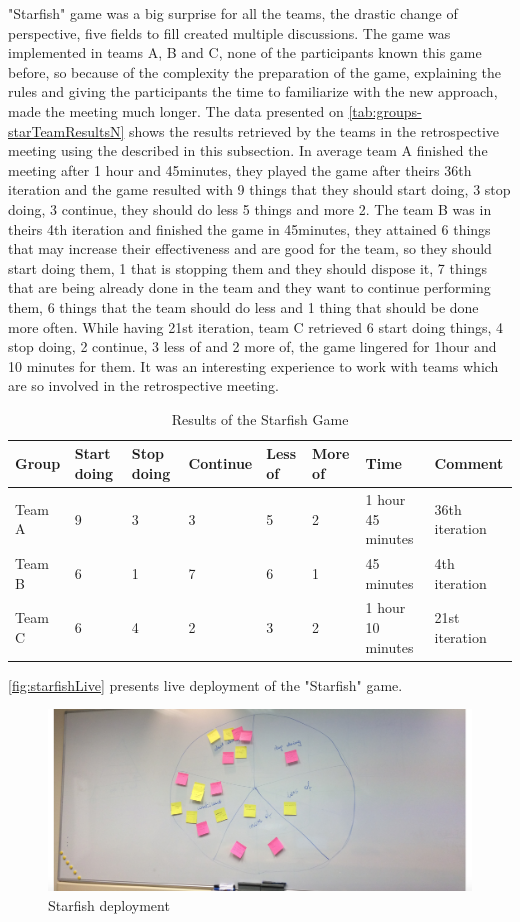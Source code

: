 "Starfish" game was a big surprise for all the teams, the drastic change of perspective, five fields to fill created multiple discussions. The game was implemented in teams A, B and C, none of the participants known this game before, so because of the complexity the preparation of the game, explaining the rules and giving the participants the time to familiarize with the new approach, made the meeting much longer. The data presented on \autoref{tab:groups-starTeamResultsN} shows the results retrieved by the teams in the retrospective meeting using the described in this subsection. In average team A finished the meeting after 1 hour and 45minutes, they played the game after theirs 36th iteration and the game resulted with 9 things that they should start doing, 3 stop doing, 3 continue, they should do less 5 things and more 2. The team B was in theirs 4th iteration and finished the game in 45minutes, they attained 6 things that may increase their effectiveness and are good for the team, so they should start doing them, 1 that is stopping them and they should dispose it, 7 things that are being already done in the team and they want to continue performing them, 6 things that the team should do less and 1 thing that should be done more often. While having 21st iteration, team C retrieved 6 start doing things, 4 stop doing, 2 continue, 3 less of and 2 more of, the game lingered for 1hour and 10 minutes for them. It was an interesting experience to work with teams which are so involved in the retrospective meeting.

\begin{table}[!htbp]
	\caption{Results of the Starfish Game}
	\label{tab:groups-starTeamResultsN}
	\begin{tabularx}{\textwidth}{|X|X|X|X|X|X|X|X|}
	\hline
		Group & Start doing & Stop doing & Continue & Less of &  More of & Time & Comment\\ \hline
		Team A & 9 & 3 & 3 & 5 & 2 & 1 hour 45 minutes & 36th iteration \\ \hline
		Team B & 6 & 1 & 7 & 6 & 1 & 45 minutes & 4th iteration\\ \hline
        Team C & 6 & 4 & 2 & 3 & 2 & 1 hour 10 minutes & 21st iteration\\ \hline
	\end{tabularx}
\end{table}

\autoref{fig:starfishLive} presents live deployment of the "Starfish" game.

\begin{figure}[!htbp]
\caption{Starfish deployment}
\label{fig:starfishLive}
\centering
\includegraphics[width=1\textwidth]{live/starfishLive}
\end{figure}


